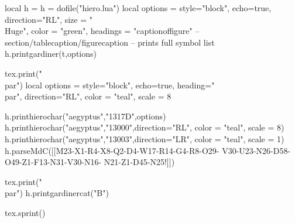\documentclass{article}
\begin{document}
\newfontfamily{}
\newfontfamily{}
\let\aegyptus\hiero
\newfontfamily{}
\parindent0pt
\raggedright


\begin{luacode*}
    local h = {}
          h = dofile("hiero.lua")
    local options = {style="block",
                     echo=true,
                     direction="RL",
                     size = "\\Huge",
                     color = "green",
                     headings = "captionof{figure}"  -- section/tablecaption/figurecaption
                     }
   -- prints full symbol list
   h.printgardiner(t,options)

   tex.print("\\par")
   local options = {style="block",
                     echo=true,
                     heading="\\par",
                     direction="RL",
                     color = "teal",
                     scale = 8}

   h.printhierochar("aegyptus","1317D",options)
   h.printhierochar("aegyptus","13000",{direction="RL",
                                        color = "teal",
                                        scale = 8})
   h.printhierochar("aegyptus","13003",{direction="LR",
                                        color = "teal",
                                        scale = 1})
   h.parseMdC([[M23-X1-R4-X8-Q2-D4-W17-R14-G4-R8-O29-
               V30-U23-N26-D58-O49-Z1-F13-N31-V30-N16-
               N21-Z1-D45-N25!]])

   tex.print("\\par")
   h.printgardinercat("B")

   tex.sprint()

\end{luacode*}

\newcommand\hierochar[2][direction = "LR",
                         color     = "teal",
                         scale     = 1]{%
               \luaexec{
                h = h or {}
                h = require("hiero.lua")  
                h.parseMdC(#2,{#1})}}
               
\newcommand\printhierochar[3][direction = "LR",
                              color     = "teal",
                              scale     = 4]{%
               \luaexec{
                h = h or {}
                h = require("hiero.lua")  
                h.printhierochar(#2,#3,{#1})}}
\end{document}
